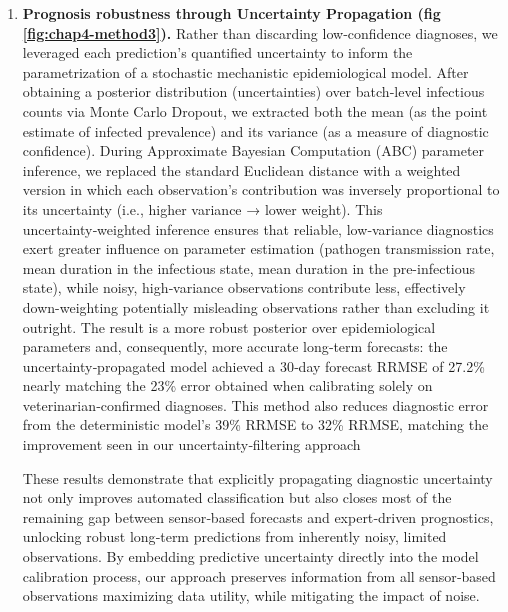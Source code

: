 \begin{enumerate}
    \item \textbf{Prognosis robustness through Uncertainty Propagation (fig \ref{fig:chap4-method3}).} Rather than discarding low‑confidence diagnoses, we leveraged each prediction’s quantified uncertainty to inform the parametrization of a stochastic mechanistic epidemiological model. After obtaining a posterior distribution (uncertainties) over batch‑level infectious counts via Monte Carlo Dropout, we extracted both the mean (as the point estimate of infected prevalence) and its variance (as a measure of diagnostic confidence). During Approximate Bayesian Computation (ABC) parameter inference, we replaced the standard Euclidean distance with a weighted version in which each observation’s contribution was inversely proportional to its uncertainty (i.e., higher variance → lower weight). This uncertainty‑weighted inference ensures that reliable, low‑variance diagnostics exert greater influence on parameter estimation (pathogen transmission rate, mean duration in the infectious state, mean duration in the pre-infectious state), while noisy, high‑variance observations contribute less, effectively down-weighting potentially misleading observations rather than excluding it outright. The result is a more robust posterior over epidemiological parameters and, consequently, more accurate long‑term forecasts: the uncertainty‑propagated model achieved a 30‑day forecast RRMSE of 27.2\% nearly matching the 23\% error obtained when calibrating solely on veterinarian‑confirmed diagnoses. This method also reduces diagnostic error from the deterministic model’s 39\% RRMSE to 32\% RRMSE, matching the improvement seen in our uncertainty‑filtering approach

    These results demonstrate that explicitly propagating diagnostic uncertainty not only improves automated classification but also closes most of the remaining gap between sensor‑based forecasts and expert‑driven prognostics, unlocking robust long‑term predictions from inherently noisy, limited observations. By embedding predictive uncertainty directly into the model calibration process, our approach preserves information from all sensor‑based observations maximizing data utility, while mitigating the impact of noise.


\end{enumerate}

